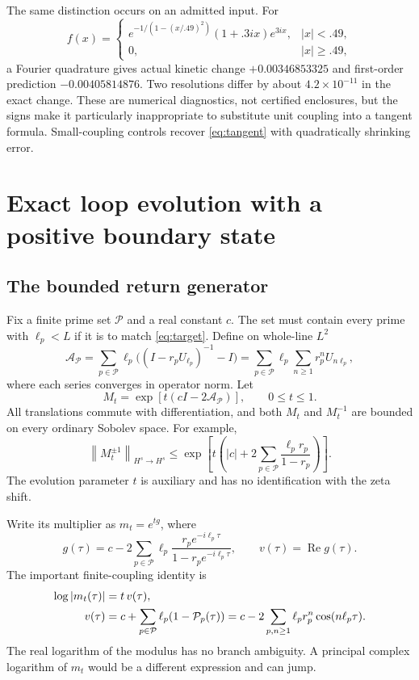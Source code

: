 \documentclass[11pt]{article}
\numberwithin{equation}{section}
\theoremstyle{definition}
\theoremstyle{remark}
\newcommand{\re}{\operatorname{Re}}
\newcommand{\norm}[1]{\left\lVert#1\right\rVert}
\begin{document}
The same distinction occurs on an admitted input. For
\begin{equation}
 f(x)=
 \begin{cases}
 e^{-1/(1-(x/.49)^2)}(1+.3ix)e^{3ix},&|x|<.49,\\
 0,&|x|\ge.49,
 \end{cases}
 \label{eq:bump}
\end{equation}
a Fourier quadrature gives actual kinetic change $+0.00346853325$ and first-order prediction $-0.00405814876$. Two resolutions differ by about $4.2\times10^{-11}$ in the exact change. These are numerical diagnostics, not certified enclosures, but the signs make it particularly inappropriate to substitute unit coupling into a tangent formula. Small-coupling controls recover \eqref{eq:tangent} with quadratically shrinking error.

\section{Exact loop evolution with a positive boundary state}
\label{sec:evolution}
\subsection{The bounded return generator}
Fix a finite prime set $\mathcal P$ and a real constant $c$. The set must contain every prime with $\ell_p<L$ if it is to match \eqref{eq:target}. Define on whole-line $L^2$
\begin{equation}
 \mathcal A_{\mathcal P}=
 \sum_{p\in\mathcal P}\ell_p\bigl((I-r_pU_{\ell_p})^{-1}-I\bigr)
 =\sum_{p\in\mathcal P}\ell_p\sum_{n\ge1}r_p^nU_{n\ell_p},
\end{equation}
where each series converges in operator norm. Let
\begin{equation}
 M_t=\exp[t(cI-2\mathcal A_{\mathcal P})],\qquad0\le t\le1.
 \label{eq:Mt}
\end{equation}
All translations commute with differentiation, and both $M_t$ and $M_t^{-1}$ are bounded on every ordinary Sobolev space. For example,
\begin{equation}
 \norm{M_t^{\pm1}}_{H^s\to H^s}
 \le\exp\left[t\left(|c|+2\sum_{p\in\mathcal P}
 \frac{\ell_pr_p}{1-r_p}\right)\right].
 \label{eq:Mbound}
\end{equation}
The evolution parameter $t$ is auxiliary and has no identification with the zeta shift.

Write its multiplier as $m_t=e^{tg}$, where
\begin{equation}
 g(\tau)=c-2\sum_{p\in\mathcal P}
 \ell_p\frac{r_pe^{-i\ell_p\tau}}{1-r_pe^{-i\ell_p\tau}},
 \qquad v(\tau)=\re g(\tau).
 \label{eq:g}
\end{equation}
The important finite-coupling identity is
\begin{align}
 \log|m_t(\tau)|&=t\,v(\tau),\notag\\
 v(\tau)&=c+\sum_{p\in\mathcal P}\ell_p(1-\mathcal P_p(\tau))
 =c-2\sum_{p,n\ge1}\ell_pr_p^n\cos(n\ell_p\tau).
 \label{eq:exactlog}
\end{align}
The real logarithm of the modulus has no branch ambiguity. A principal complex logarithm of $m_t$ would be a different expression and can jump.
\end{document}
